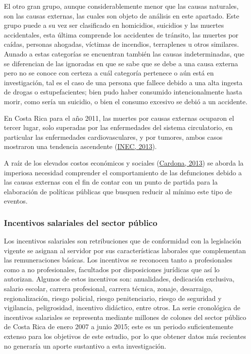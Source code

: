 \documentclass[
]{article}
\begin{document}
El otro gran grupo, aunque considerablemente menor que las causas
naturales, son las causas externas, las cuales son objeto de análisis en
este apartado. Este grupo puede a su vez ser clasificado en homicidios,
suicidios y las muertes accidentales, esta última comprende los
accidentes de tránsito, las muertes por caídas, personas ahogadas,
víctimas de incendios, terraplenes u otros similares. Aunado a estas
categorías se encuentran también las causas indeterminadas, que se
diferencian de las ignoradas en que se sabe que se debe a una causa
externa pero no se conoce con certeza a cuál categoría pertenece o aún
está en investigación, tal es el caso de una persona que fallece debido
a una alta ingesta de drogas o estupefacientes; bien pudo haber
consumido intencionalmente hasta morir, como sería un suicidio, o bien
el consumo excesivo se debió a un accidente.

En Costa Rica para el año 2011, las muertes por causas externas ocuparon
el tercer lugar, solo superadas por las enfermedades del sistema
circulatorio, en particular las enfermedades cardiovasculares, y por
tumores, ambos casos mostraron una tendencia ascendente
(\protect\hyperlink{ref-nacion}{INEC, 2013}).

A raíz de los elevados costos económicos y sociales
(\protect\hyperlink{ref-ccpexternas}{Cardona, 2013}) se aborda la
imperiosa necesidad comprender el comportamiento de las defunciones
debido a las causas externas con el fin de contar con un punto de
partida para la elaboración de políticas públicas que busquen reducir al
mínimo este tipo de eventos.

\subsubsection{Incentivos salariales del sector público}

Los incentivos salariales son retribuciones que de conformidad con la
legislación vigente se asignan al servidor por sus características
laborales que complementan las remuneraciones básicas. Los incentivos se
reconocen tanto a profesionales como a no profesionales, facultados por
disposiciones jurídicas que así lo autorizan. Algunos de estos
incentivos son: anualidades, dedicación exclusiva, salario escolar,
carrera profesional, carrera técnica, zonaje, desarraigo,
regionalización, riesgo policial, riesgo penitenciario, riesgo de
seguridad y vigilancia, peligrosidad, incentivo didáctico, entre otros.
La serie cronológica de incentivos salariales se representa mediante
millones de colones del sector público de Costa Rica de enero 2007 a
junio 2015; este es un periodo suficientemente extenso para los
objetivos de este estudio, por lo que obtener datos más recientes no
generaría un aporte sustantivo a esta investigación.
\end{document}

